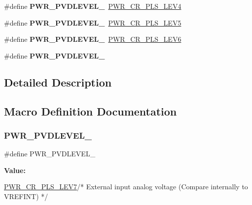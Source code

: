 \begin{DoxyCompactItemize}
\#define {\bfseries P\+W\+R\+\_\+\+P\+V\+D\+L\+E\+V\+E\+L\+\_}~\hyperlink{group___peripheral___registers___bits___definition_ga0fe79f097ea6c30a4ccf69ed3e177f85}{P\+W\+R\+\_\+\+C\+R\+\_\+\+P\+L\+S\+\_\+\+L\+E\+V4}
\item 
\mbox{\label{group___p_w_r___p_v_d__detection__level_ga46a1476440945c2b6426b4973172f24b}} 
\#define {\bfseries P\+W\+R\+\_\+\+P\+V\+D\+L\+E\+V\+E\+L\+\_}~\hyperlink{group___peripheral___registers___bits___definition_ga326781d09a07b4d215424fbbae11b7b2}{P\+W\+R\+\_\+\+C\+R\+\_\+\+P\+L\+S\+\_\+\+L\+E\+V5}
\item 
\mbox{\label{group___p_w_r___p_v_d__detection__level_ga5dda7d0ac3fd3d606666455ca3c8f537}} 
\#define {\bfseries P\+W\+R\+\_\+\+P\+V\+D\+L\+E\+V\+E\+L\+\_}~\hyperlink{group___peripheral___registers___bits___definition_gaaff17e9c7fe7d837523b1e9a2f4e9baf}{P\+W\+R\+\_\+\+C\+R\+\_\+\+P\+L\+S\+\_\+\+L\+E\+V6}
\item 
\#define {\bfseries P\+W\+R\+\_\+\+P\+V\+D\+L\+E\+V\+E\+L\+\_}
\end{DoxyCompactItemize}


\subsection{Detailed Description}


\subsection{Macro Definition Documentation}
\mbox{\label{group___p_w_r___p_v_d__detection__level_ga2c5cd8dd26b13bdf0164c1f7596b4bfd}} 
\subsubsection{\texorpdfstring{P\+W\+R\+\_\+\+P\+V\+D\+L\+E\+V\+E\+L\+\_}{PWR\_PVDLEVEL\_7}}
{\footnotesize\ttfamily \#define P\+W\+R\+\_\+\+P\+V\+D\+L\+E\+V\+E\+L\+\_}

{\bfseries Value\+:}
\begin{DoxyCode}
\hyperlink{group___peripheral___registers___bits___definition_ga95e3b301b5470ae94d32c53a9fbdfc8b}{PWR\_CR\_PLS\_LEV7}\textcolor{comment}{/* External input analog voltage }
\textcolor{comment}{                                                          (Compare internally to VREFINT) */}
\end{DoxyCode}
